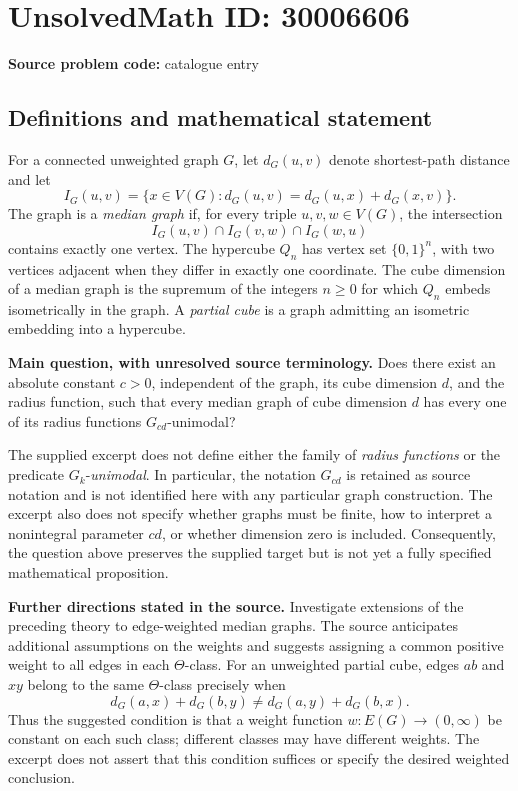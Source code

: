 \documentclass[11pt]{article}
\begin{document}
\section*{UnsolvedMath ID: 30006606}
\textbf{Source problem code:} catalogue entry
\subsection{Definitions and mathematical statement}
For a connected unweighted graph \(G\), let \(d_G(u,v)\) denote shortest-path distance and let
\[
I_G(u,v)=\{x\in V(G):d_G(u,v)=d_G(u,x)+d_G(x,v)\}.
\]
The graph is a \emph{median graph} if, for every triple \(u,v,w\in V(G)\), the intersection
\[
I_G(u,v)\cap I_G(v,w)\cap I_G(w,u)
\]
contains exactly one vertex. The hypercube \(Q_n\) has vertex set \(\{0,1\}^n\), with two vertices adjacent when they differ in exactly one coordinate. The cube dimension of a median graph is the supremum of the integers \(n\geq 0\) for which \(Q_n\) embeds isometrically in the graph. A \emph{partial cube} is a graph admitting an isometric embedding into a hypercube.

\textbf{Main question, with unresolved source terminology.} Does there exist an absolute constant \(c>0\), independent of the graph, its cube dimension \(d\), and the radius function, such that every median graph of cube dimension \(d\) has every one of its radius functions \(G_{cd}\)-unimodal?

The supplied excerpt does not define either the family of \emph{radius functions} or the predicate \(G_k\)-\emph{unimodal}. In particular, the notation \(G_{cd}\) is retained as source notation and is not identified here with any particular graph construction. The excerpt also does not specify whether graphs must be finite, how to interpret a nonintegral parameter \(cd\), or whether dimension zero is included. Consequently, the question above preserves the supplied target but is not yet a fully specified mathematical proposition.

\textbf{Further directions stated in the source.} Investigate extensions of the preceding theory to edge-weighted median graphs. The source anticipates additional assumptions on the weights and suggests assigning a common positive weight to all edges in each \(\Theta\)-class. For an unweighted partial cube, edges \(ab\) and \(xy\) belong to the same \(\Theta\)-class precisely when
\[
d_G(a,x)+d_G(b,y)\ne d_G(a,y)+d_G(b,x).
\]
Thus the suggested condition is that a weight function \(w:E(G)\to(0,\infty)\) be constant on each such class; different classes may have different weights. The excerpt does not assert that this condition suffices or specify the desired weighted conclusion.
\end{document}
